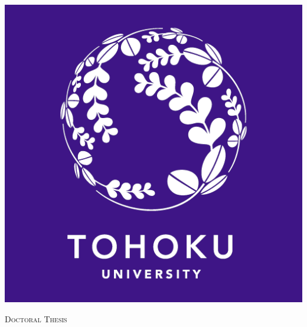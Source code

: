 \documentclass[
11pt, %
oneside, %
english, %
singlespacing, %
liststotoc, %
]{MastersDoctoralThesis} %
\author{Tran Quang-Thanh} %
\begin{document}
\frontmatter %

\pagestyle{plain} %


\begin{titlepage}
\begin{center}
\vspace*{.05\textheight}
{\scshape\LARGE \univname\par}\vspace{1.5cm} %

\includegraphics[scale=0.15]{logo} \vspace{0.5cm} %

\textsc{\Large Doctoral Thesis }\\[0.5cm] %

\HRule \\[0.4cm] %
{\huge \bfseries \ttitle\par}\vspace{0.4cm} %
\HRule \\[1.5cm] %
 

\end{center}
\end{titlepage}
\end{document}
